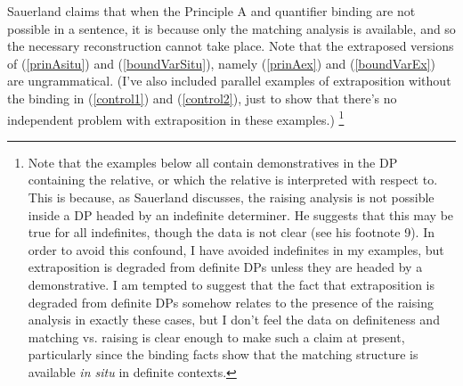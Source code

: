 Sauerland claims that when the Principle A and quantifier binding are not possible in a sentence, it is because only the matching analysis is available, and so the necessary reconstruction cannot take place. Note that the extraposed versions of (\ref{prinAsitu}) and (\ref{boundVarSitu}), namely (\ref{prinAex}) and (\ref{boundVarEx}) are ungrammatical. (I've also included parallel examples of extraposition without the binding in (\ref{control1}) and (\ref{control2}), just to show that there's no independent problem with extraposition in these examples.) \footnote{Note that the examples below all contain demonstratives in the DP containing the relative, or which the relative is interpreted with respect to. This is because, as Sauerland discusses, the raising analysis is not possible inside a DP headed by an indefinite determiner. He suggests that this may be true for all indefinites, though the data is not clear (see his footnote 9). In order to avoid this confound, I have avoided indefinites in my examples, but extraposition is degraded from definite DPs \citep[][and references therein]{baltin2006} unless they are headed by a demonstrative. I am tempted to suggest that the fact that extraposition is degraded from definite DPs somehow relates to the presence of the raising analysis in exactly these cases, but I don't feel the data on definiteness and matching vs. raising is clear enough to make such a claim at present, particularly since the binding facts show that the matching structure is available \textsl{in situ} in definite contexts.}

